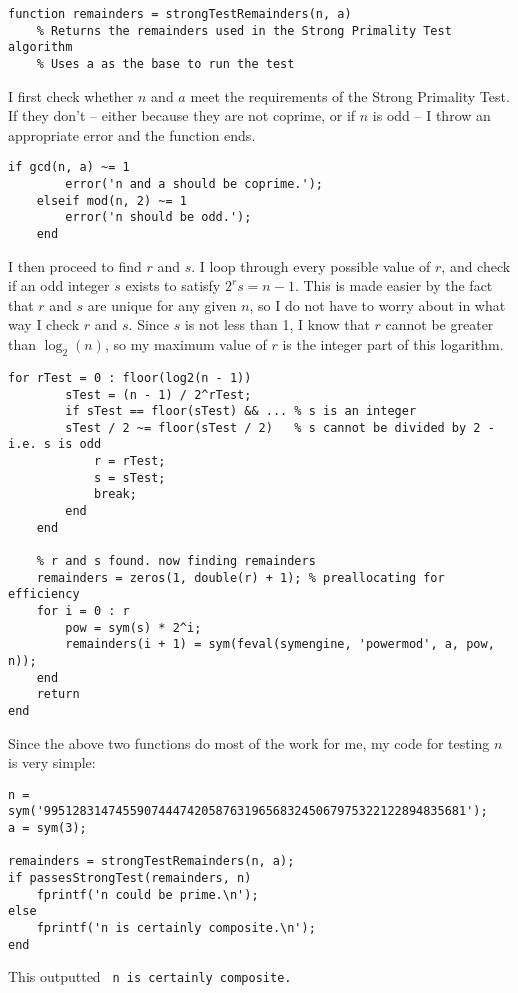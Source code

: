 \documentclass[11pt]{article}
\begin{document}
\begin{Verbatim}[xleftmargin=0.5in]
function remainders = strongTestRemainders(n, a)
    % Returns the remainders used in the Strong Primality Test algorithm
    % Uses a as the base to run the test
\end{Verbatim}
I first check whether $n$ and $a$ meet the requirements of the Strong Primality Test. If they don't -- either because they are not coprime, or if $n$ is odd -- I throw an appropriate error and the function ends.
\begin{Verbatim}[xleftmargin=0.5in]
    if gcd(n, a) ~= 1
        error('n and a should be coprime.');        
    elseif mod(n, 2) ~= 1
        error('n should be odd.');
    end
\end{Verbatim}
I then proceed to find $r$ and $s$. I loop through every possible value of $r$, and check if an odd integer $s$ exists to satisfy $2^rs = n - 1$. This is made easier by the fact that $r$ and $s$ are unique for any given $n$, so I do not have to worry about in what way I check $r$ and $s$. Since $s$ is not less than 1, I know that $r$ cannot be greater than $\log_2(n)$, so my maximum value of $r$ is the integer part of this logarithm.
\begin{Verbatim}[xleftmargin=0.5in]
    for rTest = 0 : floor(log2(n - 1))
        sTest = (n - 1) / 2^rTest;
        if sTest == floor(sTest) && ... % s is an integer
        sTest / 2 ~= floor(sTest / 2)   % s cannot be divided by 2 - i.e. s is odd
            r = rTest;
            s = sTest;
            break;
        end
    end
    
    % r and s found. now finding remainders
    remainders = zeros(1, double(r) + 1); % preallocating for efficiency
    for i = 0 : r
        pow = sym(s) * 2^i;
        remainders(i + 1) = sym(feval(symengine, 'powermod', a, pow, n));
    end
    return
end
\end{Verbatim}
Since the above two functions do most of the work for me, my code for testing $n$ is very simple:
\begin{Verbatim}[xleftmargin=0.5in]
n = sym('99512831474559074447420587631965683245067975322122894835681');
a = sym(3);

remainders = strongTestRemainders(n, a);
if passesStrongTest(remainders, n)
    fprintf('n could be prime.\n'); 
else
    fprintf('n is certainly composite.\n');
end
\end{Verbatim}
This outputted \texttt{ n is certainly composite.}
\end{document}
